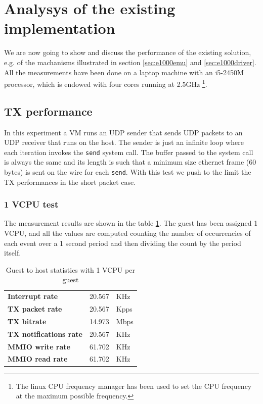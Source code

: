\section{Analysys of the existing implementation}
\label{sec:e1000perf}
We are now going to show and discuss the performance of the existing solution, e.g. of the machanisms illustrated in section 
\ref{sec:e1000emu} and \ref{sec:e1000driver}.
All the measurements have been done on a laptop machine with an i5-2450M processor, which is endowed with four cores running at 2.5GHz
\footnote{The linux CPU frequency manager has been used to set the CPU frequency at the maximum possible frequency.}.

\subsection{TX performance}
\label{sec:e1000txperf}
In this experiment a VM runs an UDP sender that sends UDP packets to an UDP receiver that runs on the host. The sender is just an 
infinite loop where each iteration invokes the \texttt{send} system call. The buffer passed to the system call is always the same and its
length is such that a minimum size ethernet frame (60 bytes) is sent on the wire for each \texttt{send}.
With this test we push to the limit the TX performances in the short packet case.


\subsubsection{1 VCPU test}
\label{sec:e1000-tx-g2h1vcpu}
The measurement results are shown in the table \ref{tab:e1000-tx-g2h1vcpu}. The guest has been assigned 1 VCPU, and all the values are computed
counting the number of occurrencies of each event over a 1 second period and then dividing the count by the period itself.

\begin{table}
\begin{center}
\begin{tabular}{lrl}
\toprule
\textbf{Interrupt rate} & 20.567 & KHz\\
\textbf{TX packet rate} & 20.567 & Kpps\\
\textbf{TX bitrate} & 14.973 & Mbps\\
\textbf{TX notifications rate} & 20.567 & KHz\\
\textbf{MMIO write rate} & 61.702 & KHz\\
\textbf{MMIO read rate} & 61.702 & KHz\\
\bottomrule
\end{tabular}
\end{center}
\caption{Guest to host statistics with 1 VCPU per guest}
\label{tab:e1000-tx-g2h1vcpu}
\end{table}

